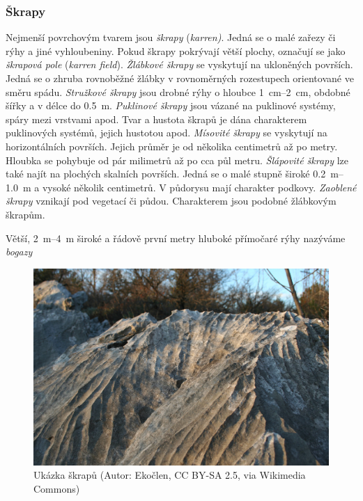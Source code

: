 \subsubsection{Škrapy}
Nejmenší povrchovým tvarem jsou \emph{škrapy} (\textit{karren)}. Jedná se o malé zařezy či rýhy a jiné vyhloubeniny. Pokud škrapy pokrývají větší plochy, označují se jako \emph{škrapová pole} (\textit{karren field}). \emph{Žlábkové škrapy}  se vyskytují na ukloněných površích. Jedná se o zhruba rovnoběžné žlábky v rovnoměrných rozestupech orientované ve směru spádu. \emph{Stružkové škrapy} jsou drobné rýhy o hloubce \SIrange{1}{2}{\centi\metre}, obdobné šířky a v délce do \SI{0,5}{\metre}. \emph{Puklinové škrapy}  jsou vázané na puklinové systémy, spáry mezi vrstvami apod. Tvar a hustota škrapů je dána charakterem puklinových systémů, jejich hustotou apod. \emph{Mísovité škrapy} se vyskytují na horizontálních površích. Jejich průměr je od několika centimetrů až po metry. Hloubka se pohybuje od pár milimetrů až po cca půl metru. \emph{Šlápovité škrapy} lze také najít na plochých skalních površích. Jedná se o malé stupně široké \SIrange{0,2}{1,0}{\metre} a vysoké několik centimetrů. V půdorysu mají charakter podkovy. \emph{Zaoblené škrapy} vznikají pod vegetací či půdou. Charakterem jsou podobné žlábkovým škrapům.

Větší, \SIrange{2}{4}{\metre} široké a řádově první metry hluboké přímočaré rýhy nazýváme \emph{bogazy}


\begin{figure}[h]
	\centering
	\includegraphics[width=1\linewidth]{obrazky/karst/skrapy1}
	\caption{Ukázka škrapů (Autor: Ekočlen, CC BY-SA 2.5, via Wikimedia Commons)}
	\label{fig:skrapy1}
\end{figure}

